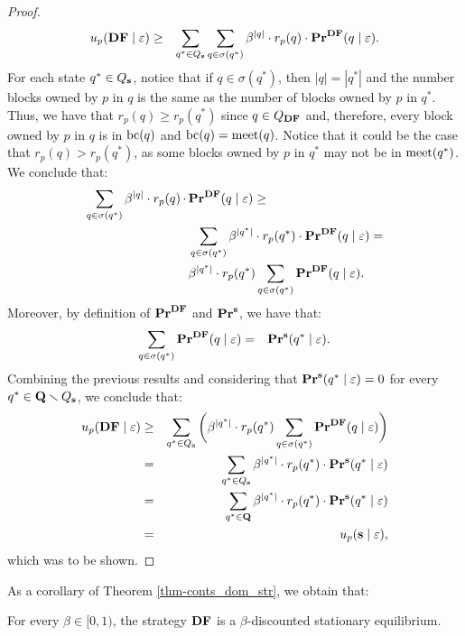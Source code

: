 \begin{proof}
\begin{eqnarray*}
u_p(\text{\rm {\bf DF}} \mid \varepsilon) & \geq &\sum_{q^* \in Q_{\mathbf{s}}}   \sum_{q \in \sigma(q^*)} \beta^{|q|} \cdot  r_p(q) \cdot \mathbf{Pr}^{\text{\rm {\bf DF}}}(q \mid \varepsilon).
\end{eqnarray*}
For each state $q^* \in Q_{\mathbf{s}}$, notice that if $q \in \sigma(q^*)$, then $|q| = |q^*|$ and the number blocks owned by $p$ in $q$ is the same as the number of blocks owned by $p$ in $q^*$. Thus, we have that $r_p(q) \geq r_p(q^*)$ since $q \in Q_{\text{\rm {\bf DF}}}$ and, therefore, every block owned by $p$ in $q$ is in $\text{bc}(q)$ and $\text{bc}(q) = \text{\rm meet}(q)$.
        Notice that it could be the case that $r_p(q) > r_p(q^*)$, as some blocks owned by $p$ in $q^*$  may not be in $\text{\rm meet}(q^*)$. We conclude that:
\begin{align*}
\sum_{q \in \sigma(q^*)} \beta^{|q|} \cdot  r_p(q) \, \cdot \, & \mathbf{Pr}^{\text{\rm {\bf DF}}}(q \mid \varepsilon) \geq \\
&\sum_{q \in \sigma(q^*)} \beta^{|q^*|} \cdot  r_p(q^*) \cdot \mathbf{Pr}^{\text{\rm {\bf DF}}}(q \mid \varepsilon) = \\
&\beta^{|q^*|} \cdot  r_p(q^*) \sum_{q \in \sigma(q^*)}  \mathbf{Pr}^{\text{\rm {\bf DF}}}(q \mid \varepsilon).
\end{align*}
Moreover, by definition of $\mathbf{Pr}^{\text{\rm {\bf DF}}}$ and $\mathbf{Pr}^{\mathbf{s}}$, we have that:
\begin{eqnarray*}
\sum_{q \in \sigma(q^*)}  \mathbf{Pr}^{\text{\rm {\bf DF}}}(q \mid \varepsilon) & = & \mathbf{Pr}^{\mathbf{s}}(q^* \mid \varepsilon).
\end{eqnarray*}
Combining the previous results and considering that $\mathbf{Pr}^{\mathbf{s}}(q^* \mid \varepsilon) = 0$ for every $q^* \in \mathbf{Q} \smallsetminus Q_{\mathbf{s}}$, we conclude that: 
\begin{eqnarray*}
u_p(\text{\rm {\bf DF}} \mid \varepsilon) & \geq & \sum_{q^* \in Q_{\mathbf{s}}} \bigg(\beta^{|q^*|} \cdot  r_p(q^*) \sum_{q \in \sigma(q^*)}  \mathbf{Pr}^{\text{\rm {\bf DF}}}(q \mid \varepsilon)\bigg)\\
& = & \sum_{q^* \in Q_{\mathbf{s}}} \beta^{|q^*|} \cdot  r_p(q^*) \cdot \mathbf{Pr}^{\mathbf{s}}(q^* \mid \varepsilon)\\
& = & \sum_{q^* \in \mathbf{Q}} \beta^{|q^*|} \cdot  r_p(q^*) \cdot \mathbf{Pr}^{\mathbf{s}}(q^* \mid \varepsilon)\\
& = & u_p(\mathbf{s} \mid \varepsilon), 
\end{eqnarray*}
which was to be shown.
\end{proof}
As a corollary of Theorem \ref{thm-conts_dom_str}, we obtain that:
\begin{mycor}\label{cor-conts_equlibria}
For every $\beta \in [0,1)$, the strategy $\text{\rm {\bf DF}}$ is a $\beta$-discounted stationary equilibrium.
\end{mycor} 
